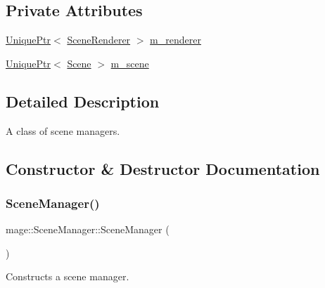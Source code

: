 \subsection*{Private Attributes}
\begin{DoxyCompactItemize}
\item 
\hyperlink{namespacemage_a3316d7143a973e37adf1110f2e80ca31}{Unique\+Ptr}$<$ \hyperlink{classmage_1_1_scene_renderer}{Scene\+Renderer} $>$ \hyperlink{classmage_1_1_scene_manager_ac50da0df383825fa3b4627cb42981498}{m\+\_\+renderer}
\item 
\hyperlink{namespacemage_a3316d7143a973e37adf1110f2e80ca31}{Unique\+Ptr}$<$ \hyperlink{classmage_1_1_scene}{Scene} $>$ \hyperlink{classmage_1_1_scene_manager_a774c610dba3ece25acf97915b6368a1a}{m\+\_\+scene}
\end{DoxyCompactItemize}


\subsection{Detailed Description}
A class of scene managers. 

\subsection{Constructor \& Destructor Documentation}
\hypertarget{classmage_1_1_scene_manager_a25a1185ca41db52d046a5901b301a0be}{}\label{classmage_1_1_scene_manager_a25a1185ca41db52d046a5901b301a0be} 
\subsubsection{\texorpdfstring{Scene\+Manager()}{SceneManager()}\hspace{0.1cm}{\footnotesize\ttfamily [1/3]}}
{\footnotesize\ttfamily mage\+::\+Scene\+Manager\+::\+Scene\+Manager (\begin{DoxyParamCaption}{ }\end{DoxyParamCaption})}

Constructs a scene manager. \hypertarget{classmage_1_1_scene_manager_a450ce8e4d52483a2dcc3bb090f565373}{}\label{classmage_1_1_scene_manager_a450ce8e4d52483a2dcc3bb090f565373} 
